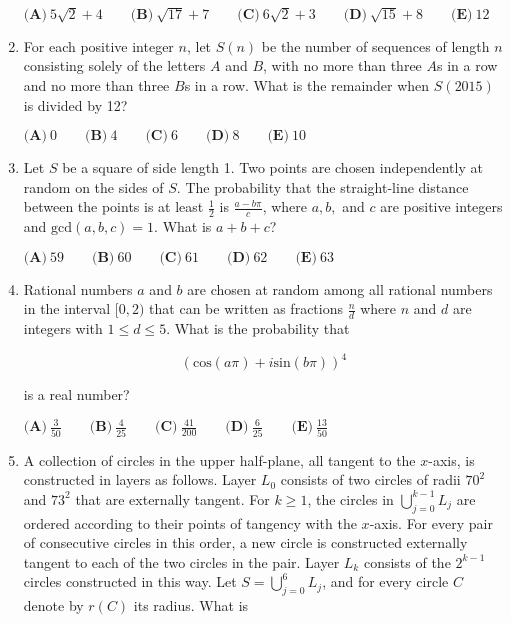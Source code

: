 \documentclass{article}
\begin{document}
\begin{enumerate}[label=\arabic*., itemsep=0.5em]
\( \textbf{(A)}\ 5\sqrt{2}+4 \qquad\textbf{(B)}\ \sqrt{17}+7 \qquad\textbf{(C)}\ 6\sqrt{2}+3 \qquad\textbf{(D)}\ \sqrt{15}+8 \qquad\textbf{(E)}\ 12\)\par \vspace{0.5em}\item For each positive integer \(n\), let \(S(n)\) be the number of sequences of length \(n\) consisting solely of the letters \(A\) and \(B\), with no more than three \(A\)s in a row and no more than three \(B\)s in a row. What is the remainder when \(S(2015)\) is divided by 12?

\( \textbf{(A)}\ 0 \qquad\textbf{(B)}\ 4 \qquad\textbf{(C)}\ 6 \qquad\textbf{(D)}\ 8 \qquad\textbf{(E)}\ 10\)\par \vspace{0.5em}\item Let \(S\) be a square of side length 1. Two points are chosen independently at random on the sides of \(S\). The probability that the straight-line distance between the points is at least \(\frac12\) is \(\frac{a-b\pi}{c}\), where \(a,b,\) and \(c\) are positive integers and \(\text{gcd}(a,b,c) = 1\). What is \(a+b+c\)?

\( \textbf{(A)}\ 59 \qquad\textbf{(B)}\ 60 \qquad\textbf{(C)}\ 61 \qquad\textbf{(D)}\ 62 \qquad\textbf{(E)}\ 63\)\par \vspace{0.5em}\item Rational numbers \(a\) and \(b\) are chosen at random among all rational numbers in the interval \([0,2)\) that can be written as fractions \(\frac{n}{d}\) where \(n\) and \(d\) are integers with \(1 \le d \le 5\). What is the probability that

\begin{equation*}
(\text{cos}(a\pi)+i\text{sin}(b\pi))^4
\end{equation*}

is a real number?

\( \textbf{(A)}\ \frac{3}{50} \qquad\textbf{(B)}\ \frac{4}{25} \qquad\textbf{(C)}\ \frac{41}{200} \qquad\textbf{(D)}\ \frac{6}{25} \qquad\textbf{(E)}\ \frac{13}{50}\)\par \vspace{0.5em}\item A collection of circles in the upper half-plane, all tangent to the \(x\)-axis, is constructed in layers as follows. Layer \(L_0\) consists of two circles of radii \(70^2\) and \(73^2\) that are externally tangent. For \(k\ge1\), the circles in \(\bigcup_{j=0}^{k-1}L_j\) are ordered according to their points of tangency with the \(x\)-axis. For every pair of consecutive circles in this order, a new circle is constructed externally tangent to each of the two circles in the pair. Layer \(L_k\) consists of the \(2^{k-1}\) circles constructed in this way. Let \(S=\bigcup_{j=0}^{6}L_j\), and for every circle \(C\) denote by \(r(C)\) its radius. What is


\end{enumerate}
\end{document}

